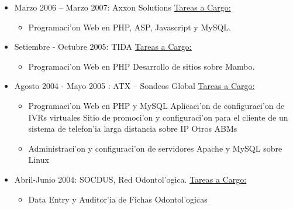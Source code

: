 \begin{itemize}
	\item Marzo 2006 -- Marzo 2007: Axxon Solutions
		\subitem \underline{Tareas a Cargo:}
			\begin{itemize}
				\item Programaci'on Web en PHP, ASP, Javascript y MySQL.
			\end{itemize}

	\item Setiembre - Octubre 2005: TIDA
		\subitem \underline{Tareas a Cargo:}
			\begin{itemize}
				\item Programaci'on Web en PHP
					\subitem Desarrollo de sitios sobre Mambo.
			\end{itemize}

	\item Agosto 2004 - Mayo 2005 : ATX -- Sondeos Global
		\subitem \underline{Tareas a Cargo:}
			\begin{itemize}
				\item Programaci'on Web en PHP y MySQL
					\subitem Aplicaci'on de configuraci'on de IVRs virtuales
					\subitem Sitio de promoci'on y configuraci'on para el
					cliente de un sistema de telefon'ia larga distancia sobre IP
					\subitem Otros ABMs
				\item Administraci'on y configuraci'on de servidores Apache y MySQL sobre Linux
			\end{itemize}

	\item Abril-Junio 2004: SOCDUS, Red Odontol'ogica.
		\subitem \underline{Tareas a Cargo:}
			\begin{itemize}
				\item Data Entry y Auditor'ia de Fichas Odontol'ogicas
			\end{itemize}
\end{itemize}
